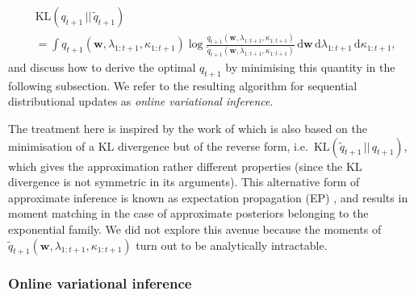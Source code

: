 \begin{itemize}
	\begin{equation}
	\begin{split}
		& \mathrm{KL}(q_{t+1} \, || \, \widetilde{q}_{t+1})
		\\
		&= \int q_{t+1}(\mathbf{w}, \lambda_{1:t+1}, \kappa_{1:t+1})
		\log\frac{q_{t+1}(\mathbf{w}, \lambda_{1:t+1}, \kappa_{1:t+1})}{\widetilde{q}_{t+1}(\mathbf{w}, \lambda_{1:t+1}, \kappa_{1:t+1})}
		\,\mathrm{d}\mathbf{w}\,\mathrm{d}\lambda_{1:t+1}\,\mathrm{d}\kappa_{1:t+1},
	\end{split}
	\end{equation}
	and discuss how to derive the optimal $q_{t+1}$ by minimising this quantity in the following subsection. We refer to the resulting algorithm for sequential distributional updates as \emph{online variational inference}.
\end{itemize}
The treatment here is inspired by the work of \citet{opper98} which is also based on the minimisation of a KL divergence but of the reverse form, i.e.\ $\mathrm{KL}(\widetilde{q}_{t+1} \, || \, q_{t+1})$, which gives the approximation rather different properties (since the KL divergence is not symmetric in its arguments). This alternative form of approximate inference is known as expectation propagation (EP) \citep{minka01a, minka01b}, and results in moment matching in the case of approximate posteriors belonging to the exponential family. We did not explore this avenue because the moments of $\widetilde{q}_{t+1}(\mathbf{w}, \lambda_{1:t+1}, \kappa_{1:t+1})$ turn out to be analytically intractable.

\subsubsection{Online variational inference}

